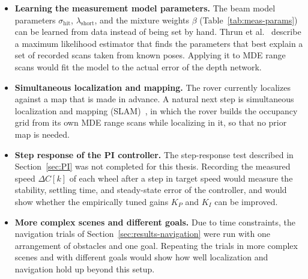 \begin{itemize}
  \item \textbf{Learning the measurement model parameters.} The beam model parameters
  $\sigma_{\mathrm{hit}}$, $\lambda_{\mathrm{short}}$, and the mixture weights $\beta$
  (Table~\ref{tab:meas-params}) can be learned from data instead of being set by hand. Thrun et
  al.~\cite{thrun2005probabilistic} describe a maximum likelihood estimator that finds the
  parameters that best explain a set of recorded scans taken from known poses. Applying it to
  MDE range scans would fit the model to the actual error of the depth network.

  \item \textbf{Simultaneous localization and mapping.} The rover currently localizes against a
  map that is made in advance. A natural next step is simultaneous localization and mapping
  (SLAM)~\cite{durrantwhyte2006slam}, in which the rover builds the occupancy grid from its own
  MDE range scans while localizing in it, so that no prior map is needed.

  \item \textbf{Step response of the PI controller.} The step-response test described in
  Section~\ref{sec:PI} was not completed for this thesis. Recording the measured speed
  $\Delta C[k]$ of each wheel after a step in target speed would measure the stability,
  settling time, and steady-state error of the controller, and would show whether the
  empirically tuned gains $K_P$ and $K_I$ can be improved.

  \item \textbf{More complex scenes and different goals.} Due to time constraints, the navigation
  trials of Section~\ref{sec:results-navigation} were run with one arrangement of obstacles
   and one goal. Repeating the trials in more complex scenes and with
  different goals would show how well localization and navigation hold up beyond this setup.
\end{itemize}
